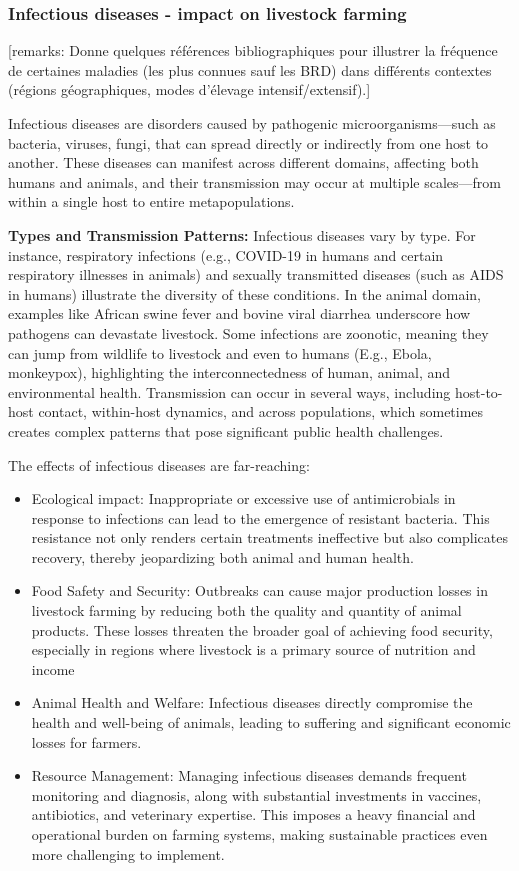 \subsubsection{Infectious diseases - impact on livestock farming}

[remarks: Donne quelques références bibliographiques pour illustrer la fréquence de certaines maladies (les plus connues sauf les BRD) dans différents contextes (régions géographiques, modes d’élevage intensif/extensif).]



Infectious diseases are disorders caused by pathogenic microorganisms—such as bacteria, viruses, fungi, that can spread directly or indirectly from one host to another. These diseases can manifest across different domains, affecting both humans and animals, and their transmission may occur at multiple scales—from within a single host to entire metapopulations.

\textbf{Types and Transmission Patterns:} Infectious diseases vary by type. For instance, respiratory infections (e.g., COVID-19 in humans and certain respiratory illnesses in animals) and sexually transmitted diseases (such as AIDS in humans) illustrate the diversity of these conditions. In the animal domain, examples like African swine fever and bovine viral diarrhea underscore how pathogens can devastate livestock. Some infections are zoonotic, meaning they can jump from wildlife to livestock and even to humans (E.g., Ebola, monkeypox), highlighting the interconnectedness of human, animal, and environmental health. Transmission can occur in several ways, including host-to-host contact, within-host dynamics, and across populations, which sometimes creates complex patterns that pose significant public health challenges.

The effects of infectious diseases are far-reaching:
\begin{itemize}
    \item Ecological impact: Inappropriate or excessive use of antimicrobials in response to infections can lead to the emergence of resistant bacteria. This resistance not only renders certain treatments ineffective but also complicates recovery, thereby jeopardizing both animal and human health.
    \item Food Safety and Security: Outbreaks can cause major production losses in livestock farming by reducing both the quality and quantity of animal products. These losses threaten the broader goal of achieving food security, especially in regions where livestock is a primary source of nutrition and income
    \item Animal Health and Welfare: Infectious diseases directly compromise the health and well-being of animals, leading to suffering and significant economic losses for farmers.
    \item Resource Management: Managing infectious diseases demands frequent monitoring and diagnosis, along with substantial investments in vaccines, antibiotics, and veterinary expertise. This imposes a heavy financial and operational burden on farming systems, making sustainable practices even more challenging to implement.
\end{itemize}

